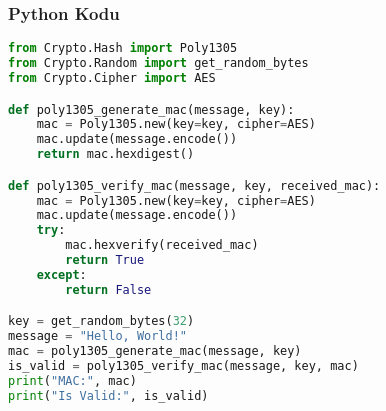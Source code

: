 \subsubsection{Python Kodu}

\begin{lstlisting}[language=Python]
from Crypto.Hash import Poly1305
from Crypto.Random import get_random_bytes
from Crypto.Cipher import AES

def poly1305_generate_mac(message, key):
    mac = Poly1305.new(key=key, cipher=AES)
    mac.update(message.encode())
    return mac.hexdigest()

def poly1305_verify_mac(message, key, received_mac):
    mac = Poly1305.new(key=key, cipher=AES)
    mac.update(message.encode())
    try:
        mac.hexverify(received_mac)
        return True
    except:
        return False

key = get_random_bytes(32)
message = "Hello, World!"
mac = poly1305_generate_mac(message, key)
is_valid = poly1305_verify_mac(message, key, mac)
print("MAC:", mac)
print("Is Valid:", is_valid)
\end{lstlisting}

\newpage
